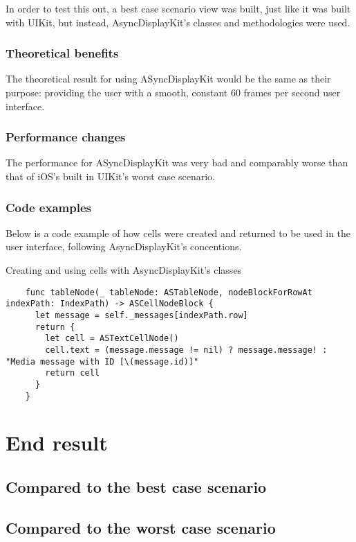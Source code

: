 \documentclass[a4paper,12pt]{article}
\begin{document}
In order to test this out, a best case scenario view was built, just like it was built with UIKit, but instead, AsyncDisplayKit's classes and methodologies were used.

\subsubsection*{Theoretical benefits}
The theoretical result for using ASyncDisplayKit would be the same as their purpose: providing the user with a smooth, constant 60 frames per second user interface.

\subsubsection*{Performance changes}
The performance for ASyncDisplayKit was very bad and comparably worse than that of iOS's built in UIKit's worst case scenario.

\subsubsection*{Code examples}
Below is a code example of how cells were created and returned to be used in the user interface, following AsyncDisplayKit's concentions.
\begin{listing}[H]
  \caption{Creating and using cells with AsyncDisplayKit's classes}
  \begin{verbatim}
    func tableNode(_ tableNode: ASTableNode, nodeBlockForRowAt indexPath: IndexPath) -> ASCellNodeBlock {
      let message = self._messages[indexPath.row]
      return {
        let cell = ASTextCellNode()
        cell.text = (message.message != nil) ? message.message! : "Media message with ID [\(message.id)]"
        return cell
      }
    }
  \end{verbatim}
\end{listing}

\newpage
\section{End result}
\subsection{Compared to the best case scenario}

\subsection{Compared to the worst case scenario}
\end{document}
